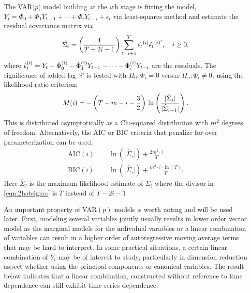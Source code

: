 The VAR($p$) model building at the $i$th stage is fitting the model, $Y_t= \Phi_0 + \Phi_1 Y_{t-1} + \cdots + \Phi_i Y_{t-i} + \epsilon_t$ via least-squares method and estimate the residual covariance matrix via
	\begin{equation} \label{eqn:2hatsigma}
	\hat{\Sigma_i} = \left( \frac{1}{T-2i-1} \right) \sum_{t=i+1}^{T}\Hat{\epsilon_t}^{(i)}{{\hat{\epsilon_t}^{(i)^\prime}}}, \quad i \geq 0,
	\end{equation}
where $ \Hat{\epsilon}_t^{(i)}= Y_t - \Hat{\Phi}_0^{(i)} - \Hat{\Phi}_1^{(i)}Y_{t-1} - \cdots - \Hat{\Phi}_i^{(i)}Y_{t-i}$ are the residuals. The significance of added lag `$i$' is tested with $H_0: \Phi_i= 0$ versus $H_a: \Phi_i \neq 0$, using the likelihood-ratio criterion:
	\begin{equation} \label{eqn:2mi}
	M(i)= -\left(T - m - i - \frac{3}{2}\right)\, \ln\left( \frac{\lvert \Hat{\Sigma}_i \rvert}{\lvert \Hat{\Sigma}_{i-1} \rvert}\right).
	\end{equation}
This is distributed asymptotically as a Chi-squared distribution with $m^2$ degrees of freedom. Alternatively, the AIC or BIC criteria that penalize for over parameterization can be used; 
	\begin{equation} \label{eqn:2aicbic}
	\begin{aligned}
	\text{AIC}(i)&= \ln\left(\lvert\tilde{\Sigma_i} \rvert \right)+\frac{2m^2 \cdot i}{T} \\
	\text{BIC}(i)&= \ln\left( \lvert \tilde{\Sigma_i} \rvert \right)+\frac{m^2 \cdot i \cdot \ln(T)}{T}.
	\end{aligned}
	\end{equation}
Here $\tilde{\Sigma_i}$ is the maximum likelihood estimate of $\Sigma_i$ where the divisor in \eqref{eqn:2hatsigma} is $T$ instead of $T - 2i - 1$.


An important property of VAR$(p)$ models is worth noting and will be used later. First, modeling several variables jointly usually results in lower order vector model as the marginal models for the individual variables or a linear combination of variables can result in a higher order of autoregressive moving average terms that may be hard to interpret. In some practical situations, a certain linear combination of $Y_t$ may be of interest to study, particularly in dimension reduction aspect whether using the principal components or canonical variables. The result below indicates that a linear combination, constructed without reference to time dependence can still exhibit time series dependence. 


